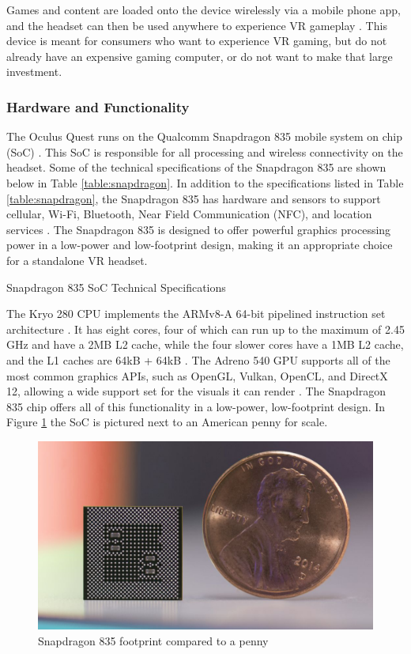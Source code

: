 Games and content are loaded onto the device wirelessly via a mobile phone app, 
and the headset can then be used anywhere to experience VR gameplay \cite{quest_features}. 
This device is meant for consumers who want to experience VR gaming, 
but do not already have an expensive gaming computer, or do not want 
to make that large investment.

\subsubsection{Hardware and Functionality}
The Oculus Quest runs on the Qualcomm Snapdragon 835 mobile system on chip (SoC) \cite{oculus_dev_page}.
This SoC is responsible for all processing and wireless connectivity on the headset. Some 
of the technical specifications of the Snapdragon 835 are shown
below in Table \ref{table:snapdragon}. In addition to the specifications listed in Table
\ref{table:snapdragon}, the Snapdragon 835 has hardware and sensors to support
cellular, Wi-Fi, Bluetooth, Near Field Communication (NFC), and location services
\cite{snapdragon_835}. The Snapdragon 835 is designed to offer powerful graphics
processing power in a low-power and low-footprint design, making it an appropriate
choice for a standalone VR headset.

\begin{table}[h]
    \centering
    \caption{Snapdragon 835 SoC Technical Specifications}
    \label{table:snapdragon} 
\end{table}

The Kryo 280 CPU implements the ARMv8-A 64-bit pipelined instruction set 
architecture \cite{kryo_arch}. It has eight cores, four of which can run up to
the maximum of 2.45 GHz and have a 2MB L2 cache, while the four slower cores have
a 1MB L2 cache, and the L1 caches are 64kB + 64kB \cite{snapdragon_cache}. The Adreno
540 GPU supports all of the most common graphics APIs, such as OpenGL, Vulkan,
OpenCL, and DirectX 12, allowing a wide support set for the visuals it can render \cite{snapdragon_835}.
The Snapdragon 835 chip offers all of this functionality in a low-power, low-footprint
design. In Figure \ref{fig:penny_835} the SoC is pictured next to an American penny for
scale.

\begin{figure}[h]
    \centering
    \includegraphics[width=.5\linewidth]{media/snapdragon_penny.jpg}
    \caption{Snapdragon 835 footprint compared to a penny \cite{penny_pic}}
    \label{fig:penny_835}
\end{figure}

